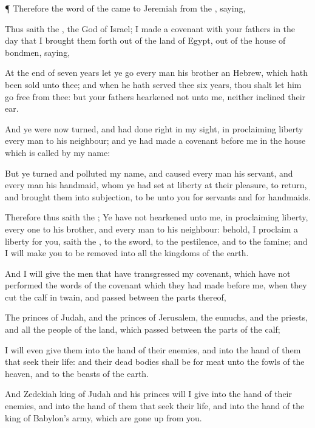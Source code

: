 {\par }{\PP {}¶ Therefore the
word of the
{} came to
Jeremiah from the
{},
saying,

Thus
saith the
{}, the
God of
Israel; I
made a
covenant with your
fathers in the
day that I brought them
forth out of the
land of
Egypt, out of the
house of
bondmen,
saying,

At the
end of
seven
years let ye
go every
man his
brother an
Hebrew, which hath been
sold unto thee; and when he hath
served thee
six
years, thou shalt let him
go
free from thee: but your
fathers
hearkened not unto me, neither
inclined their
ear.

And ye were
now
turned, and had
done
right in my
sight, in
proclaiming
liberty every
man to his
neighbour; and ye had
made a
covenant
before me in the
house which is
called by my
name:

But ye
turned and
polluted my
name, and caused every
man his
servant, and every
man his
handmaid, whom ye had
set at
liberty at their
pleasure, to
return, and brought them into
subjection, to be unto you for
servants and for
handmaids.

Therefore thus
saith the
{}; Ye have not
hearkened unto me, in
proclaiming
liberty, every
one to his
brother, and every
man to his
neighbour: behold, I
proclaim a
liberty for you,
saith the
{}, to the
sword, to the
pestilence, and to the
famine; and I will
make you to be
removed into all the
kingdoms of the
earth.

And I will
give the
men that have
transgressed my
covenant, which have not
performed the
words of the
covenant which they had
made
before me, when they
cut the
calf in
twain, and
passed between the
parts thereof,

The
princes of
Judah, and the
princes of
Jerusalem, the
eunuchs, and the
priests, and all the
people of the
land, which
passed between the
parts of the
calf;

I will even
give them into the
hand of their
enemies, and into the
hand of them that
seek their
life: and their dead
bodies shall be for
meat unto the
fowls of the
heaven, and to the
beasts of the
earth.

And
Zedekiah
king of
Judah and his
princes will I
give into the
hand of their
enemies, and into the
hand of them that
seek their
life, and into the
hand of the
king of
Babylon’s
army, which are gone
up from you.

}
